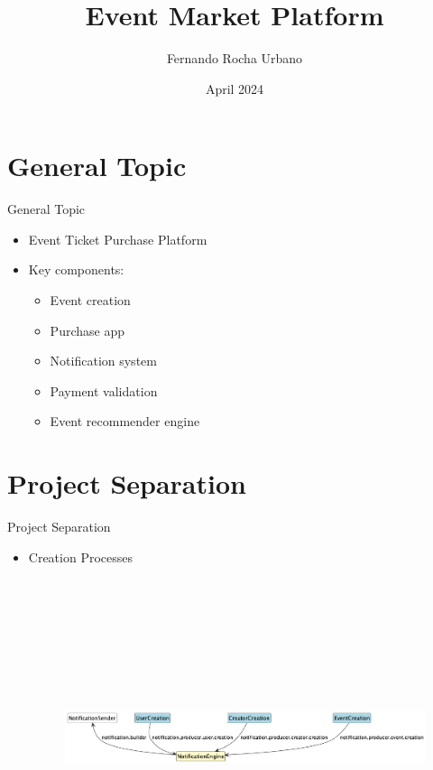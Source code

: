 \documentclass{beamer}
\title{Event Market Platform}
\author{Fernando Rocha Urbano}
\date{April 2024}
\begin{document}
\frame{\titlepage}

\section{General Topic}
\begin{frame}{General Topic}
    \begin{itemize}
        \item Event Ticket Purchase Platform
        \item Key components:
        \begin{itemize}
            \item Event creation
            \item Purchase app
            \item Notification system
            \item Payment validation
            \item Event recommender engine
        \end{itemize}
    \end{itemize}
\end{frame}

\section{Project Separation}
\begin{frame}{Project Separation}
    \begin{itemize}
        \item Creation Processes
        \begin{figure}[H]
            \centering
            \includegraphics[width=\textwidth, height=350px, keepaspectratio]{assets/uml/structure/Creation.png}
        \end{figure}
    \end{itemize}
\end{frame}
\end{document}
